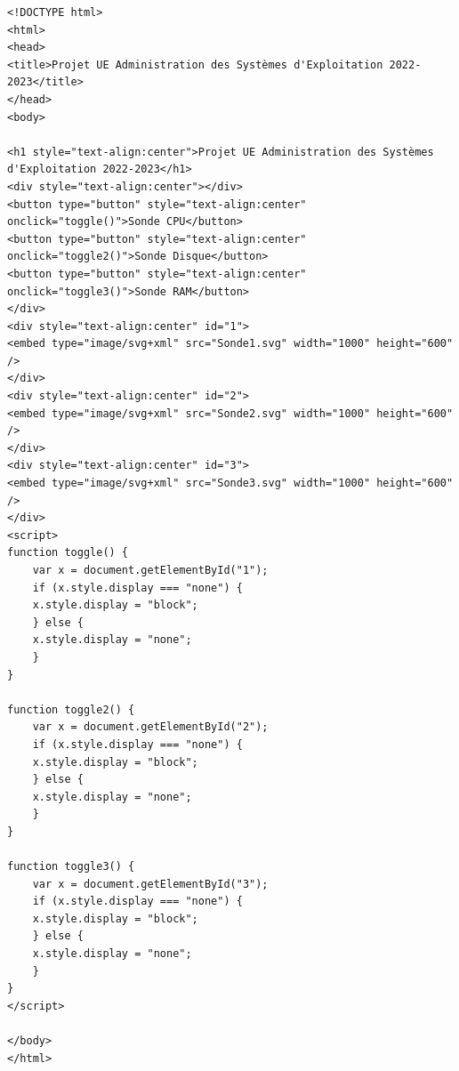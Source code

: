 \documentclass[a4paper, twoside]{report}
\begin{document}


\begin{lstlisting}[style=html]
<!DOCTYPE html>
<html>
<head>
<title>Projet UE Administration des Systèmes d'Exploitation 2022-2023</title>
</head>
<body>

<h1 style="text-align:center">Projet UE Administration des Systèmes d'Exploitation 2022-2023</h1>
<div style="text-align:center"></div>
<button type="button" style="text-align:center" onclick="toggle()">Sonde CPU</button>
<button type="button" style="text-align:center" onclick="toggle2()">Sonde Disque</button>
<button type="button" style="text-align:center" onclick="toggle3()">Sonde RAM</button>
</div>
<div style="text-align:center" id="1">
<embed type="image/svg+xml" src="Sonde1.svg" width="1000" height="600" />
</div>
<div style="text-align:center" id="2">
<embed type="image/svg+xml" src="Sonde2.svg" width="1000" height="600" />
</div>
<div style="text-align:center" id="3">
<embed type="image/svg+xml" src="Sonde3.svg" width="1000" height="600" />
</div>
<script>
function toggle() {
    var x = document.getElementById("1");
    if (x.style.display === "none") {
    x.style.display = "block";
    } else {
    x.style.display = "none";
    }
}

function toggle2() {
    var x = document.getElementById("2");
    if (x.style.display === "none") {
    x.style.display = "block";
    } else {
    x.style.display = "none";
    }
}

function toggle3() {
    var x = document.getElementById("3");
    if (x.style.display === "none") {
    x.style.display = "block";
    } else {
    x.style.display = "none";
    }
}
</script>

</body>
</html>
\end{lstlisting}
\end{document}
